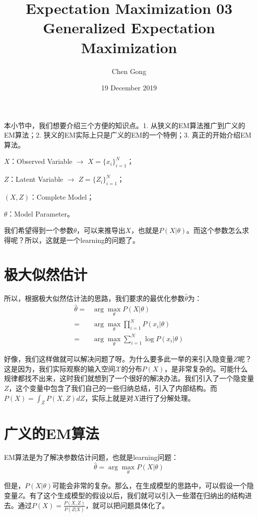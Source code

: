 \documentclass[a4paper]{article}
\title{Expectation Maximization 03  Generalized Expectation Maximization}
\author{Chen Gong}
\date{19 December 2019}
\begin{document}
\maketitle
本小节中，我们想要介绍三个方便的知识点。1. 从狭义的EM算法推广到广义的EM算法；2. 狭义的EM实际上只是广义的EM的一个特例；3. 真正的开始介绍EM算法。

$X$：Observed Variable $\longrightarrow$ $X=\{ x_i \}_{i=1}^N$；

$Z$：Latent Variable $\longrightarrow$ $Z=\{ Z_i \}_{i=1}^N$；

$(X,Z)$：Complete Model；

$\theta$：Model Parameter。

我们希望得到一个参数$\theta$，可以来推导出$X$，也就是$P(X|\theta)$。而这个参数怎么求得呢？所以，这就是一个learning的问题了。

\section{极大似然估计}
所以，根据极大似然估计法的思路，我们要求的最优化参数$\hat{\theta}$为：
\begin{equation}
    \begin{split}
        \hat{\theta} 
        = & \arg\max_{\theta} P(X|\theta) \\
        = & \arg\max_{\theta} \prod_{i=1}^N P(x_i|\theta) \\
        = & \arg\max_{\theta} \sum_{i=1}^N \log P(x_i|\theta)
    \end{split}
\end{equation}

好像，我们这样做就可以解决问题了呀。为什么要多此一举的来引入隐变量$Z$呢？这是因为，我们实际观察的输入空间$\mathcal{X}$的分布$P(X)$，是非常复杂的。可能什么规律都找不出来，这时我们就想到了一个很好的解决办法。我们引入了一个隐变量$Z$，这个变量中包含了我们自己的一些归纳总结，引入了内部结构。而$P(X) = \int_Z P(X,Z)dZ$，实际上就是对$X$进行了分解处理。

\section{广义的EM算法}

EM算法是为了解决参数估计问题，也就是learning问题：
\begin{equation}
    \hat{\theta} = \arg\max_{\theta} P(X|\theta)
\end{equation}

但是，$P(X|\theta)$可能会非常的复杂。那么，在生成模型的思路中，可以假设一个隐变量$Z$。有了这个生成模型的假设以后，我们就可以引入一些潜在归纳出的结构进去。通过$P(X) = \frac{P(X,Z)}{P(Z|X)}$，就可以把问题具体化了。
\end{document}
